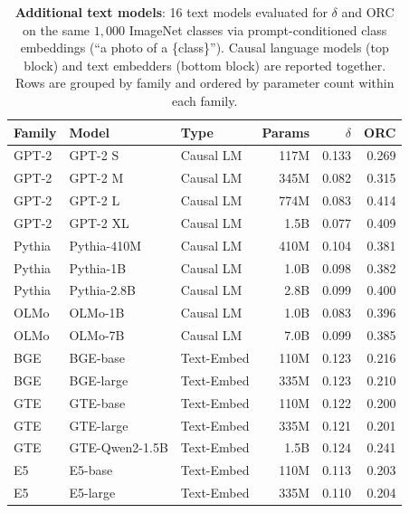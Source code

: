 \begin{table}[!htbp]
\caption{\textbf{Additional text models}: 16 text models evaluated for $\delta$ and ORC on the same $1{,}000$ ImageNet classes via prompt-conditioned class embeddings (``a photo of a \{class\}''). Causal language models (top block) and text embedders (bottom block) are reported together. Rows are grouped by family and ordered by parameter count within each family.}
\label{tab:breadth-text}
\centering\scriptsize
\begin{tabular}{lllrrr}
\toprule
Family & Model & Type & Params & $\delta$ & ORC \\
\midrule
GPT-2  & GPT-2 S        & Causal LM & 117M  & 0.133 & 0.269 \\
GPT-2  & GPT-2 M        & Causal LM & 345M  & 0.082 & 0.315 \\
GPT-2  & GPT-2 L        & Causal LM & 774M  & 0.083 & 0.414 \\
GPT-2  & GPT-2 XL       & Causal LM & 1.5B  & 0.077 & 0.409 \\
\midrule
Pythia & Pythia-410M    & Causal LM & 410M  & 0.104 & 0.381 \\
Pythia & Pythia-1B      & Causal LM & 1.0B  & 0.098 & 0.382 \\
Pythia & Pythia-2.8B    & Causal LM & 2.8B  & 0.099 & 0.400 \\
\midrule
OLMo   & OLMo-1B        & Causal LM & 1.0B  & 0.083 & 0.396 \\
OLMo   & OLMo-7B        & Causal LM & 7.0B  & 0.099 & 0.385 \\
\midrule
BGE    & BGE-base       & Text-Embed & 110M & 0.123 & 0.216 \\
BGE    & BGE-large      & Text-Embed & 335M & 0.123 & 0.210 \\
\midrule
GTE    & GTE-base       & Text-Embed & 110M & 0.122 & 0.200 \\
GTE    & GTE-large      & Text-Embed & 335M & 0.121 & 0.201 \\
GTE    & GTE-Qwen2-1.5B & Text-Embed & 1.5B & 0.124 & 0.241 \\
\midrule
E5     & E5-base        & Text-Embed & 110M & 0.113 & 0.203 \\
E5     & E5-large       & Text-Embed & 335M & 0.110 & 0.204 \\
\bottomrule
\end{tabular}
\end{table}
